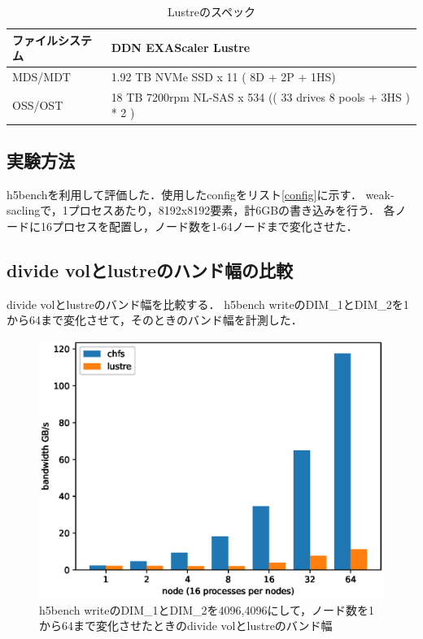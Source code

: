 \documentclass[submit,techrep,noauthor]{ipsj}
\begin{document}
\begin{table}[tbp]
	\caption{Lustreのスペック}
	\label{tab:lustre}
	\centering
	
	\begin{tabular}{l||l}
		\hline
		ファイルシステム & DDN EXAScaler Lustre                                          \\ \hline
		MDS/MDT  & 1.92 TB NVMe SSD x 11 ( 8D + 2P + 1HS)                        \\ \hline
		OSS/OST  & 18 TB 7200rpm NL-SAS x 534 (( 33 drives 8 pools + 3HS ) * 2 ) \\ \hline
	\end{tabular}
\end{table}

\subsection{実験方法}
h5benchを利用して評価した．使用したconfigをリスト\ref{config}に示す．
weak-saclingで，1プロセスあたり，8192x8192要素，計6GBの書き込みを行う．
各ノードに16プロセスを配置し，ノード数を1-64ノードまで変化させた．

\subsection{divide volとlustreのハンド幅の比較}
divide volとlustreのバンド幅を比較する．
h5bench writeのDIM\_1とDIM\_2を1から64まで変化させて，そのときのバンド幅を計測した．

\begin{figure}[tbp]
	\centering
	\includegraphics[width=\linewidth]{figure/chfs_lustre_1_64.eps}
	\caption{h5bench writeのDIM\_1とDIM\_2を4096,4096にして，ノード数を1から64まで変化させたときのdivide volとlustreのバンド幅}
	\label{fig:h5writechfslustre}
\end{figure}
\end{document}
